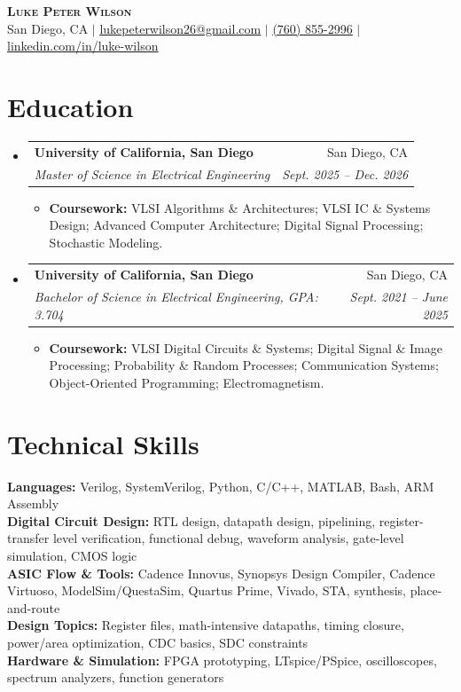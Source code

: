 \documentclass[letterpaper,10pt]{article}
\makeatletter
\newcommand{\resumeItem}[1]{\item \small{#1}}
\newcommand{\resumeSubheading}[4]{
  \vspace{1pt}\item
    \begin{tabular*}{0.97\textwidth}[t]{l@{\extracolsep{\fill}}r}
      \textbf{#1} & #2 \\
      \textit{\small #3} & \textit{\small #4} \\
    \end{tabular*}\vspace{-1pt}
}
\newcommand{\resumeItemListStart}{\begin{itemize}[leftmargin=0.18in, itemsep=0pt, topsep=1pt]}
\newcommand{\resumeItemListEnd}{\end{itemize}\vspace{-2pt}}
\newcommand{\resumeSubHeadingListStart}{\begin{itemize}[leftmargin=0.15in, label={}]}
\newcommand{\resumeSubHeadingListEnd}{\end{itemize}\vspace{-1pt}}
\makeatother
\begin{document}
\begin{center}
    \textbf{\Huge \scshape Luke Peter Wilson} \\ \vspace{2pt}
    \small San Diego, CA $|$
    \href{mailto:lukepeterwilson26@gmail.com}{\underline{lukepeterwilson26@gmail.com}} $|$
    \href{tel:+17608552996}{\underline{(760) 855-2996}} $|$
    \href{https://www.linkedin.com/in/luke-wilson-33718b238/}{\underline{linkedin.com/in/luke-wilson}}
\end{center}

\section{Education}
\resumeSubHeadingListStart
  \resumeSubheading
    {University of California, San Diego}{San Diego, CA}
    {Master of Science in Electrical Engineering}{Sept. 2025 -- Dec. 2026}
    \resumeItemListStart
      \resumeItem{\textbf{Coursework:} VLSI Algorithms \& Architectures; VLSI IC \& Systems Design; Advanced Computer Architecture; Digital Signal Processing; Stochastic Modeling.}
    \resumeItemListEnd

  \resumeSubheading
    {University of California, San Diego}{San Diego, CA}
    {Bachelor of Science in Electrical Engineering, GPA: 3.704}{Sept. 2021 -- June 2025}
    \resumeItemListStart
      \resumeItem{\textbf{Coursework:} VLSI Digital Circuits \& Systems; Digital Signal \& Image Processing; Probability \& Random Processes; Communication Systems; Object-Oriented Programming; Electromagnetism.}
    \resumeItemListEnd
\resumeSubHeadingListEnd

\section{Technical Skills}
\begin{itemize}[leftmargin=0.15in, label={}]
  \small{\item{
    \textbf{Languages:} Verilog, SystemVerilog, Python, C/C++, MATLAB, Bash, ARM Assembly \\
    \textbf{Digital Circuit Design:} RTL design, datapath design, pipelining, register-transfer level verification, functional debug, waveform analysis, gate-level simulation, CMOS logic \\
    \textbf{ASIC Flow \& Tools:} Cadence Innovus, Synopsys Design Compiler, Cadence Virtuoso, ModelSim/QuestaSim, Quartus Prime, Vivado, STA, synthesis, place-and-route \\
    \textbf{Design Topics:} Register files, math-intensive datapaths, timing closure, power/area optimization, CDC basics, SDC constraints \\
    \textbf{Hardware \& Simulation:} FPGA prototyping, LTspice/PSpice, oscilloscopes, spectrum analyzers, function generators
  }}
\end{itemize}
\end{document}
